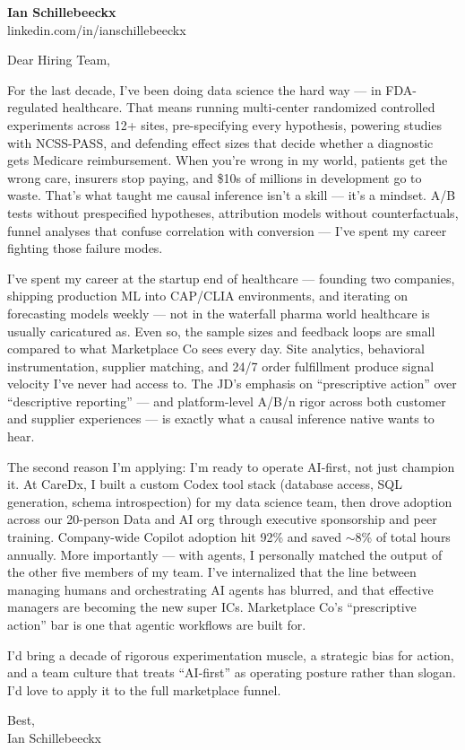 \documentclass[letterpaper,11pt]{article}
\begin{document}
\begin{flushleft}
\textbf{\Large Ian Schillebeeckx} \\
\vspace{2pt}
linkedin.com/in/ianschillebeeckx
\end{flushleft}

\vspace{12pt}

Dear Hiring Team,

For the last decade, I've been doing data science the hard way --- in FDA-regulated healthcare. That means running multi-center randomized controlled experiments across 12+ sites, pre-specifying every hypothesis, powering studies with NCSS-PASS, and defending effect sizes that decide whether a diagnostic gets Medicare reimbursement. When you're wrong in my world, patients get the wrong care, insurers stop paying, and \$10s of millions in development go to waste. That's what taught me causal inference isn't a skill --- it's a mindset. A/B tests without prespecified hypotheses, attribution models without counterfactuals, funnel analyses that confuse correlation with conversion --- I've spent my career fighting those failure modes.

I've spent my career at the startup end of healthcare --- founding two companies, shipping production ML into CAP/CLIA environments, and iterating on forecasting models weekly --- not in the waterfall pharma world healthcare is usually caricatured as. Even so, the sample sizes and feedback loops are small compared to what Marketplace Co sees every day. Site analytics, behavioral instrumentation, supplier matching, and 24/7 order fulfillment produce signal velocity I've never had access to. The JD's emphasis on ``prescriptive action'' over ``descriptive reporting'' --- and platform-level A/B/n rigor across both customer and supplier experiences --- is exactly what a causal inference native wants to hear.

The second reason I'm applying: I'm ready to operate AI-first, not just champion it. At CareDx, I built a custom Codex tool stack (database access, SQL generation, schema introspection) for my data science team, then drove adoption across our 20-person Data and AI org through executive sponsorship and peer training. Company-wide Copilot adoption hit 92\% and saved $\sim$8\% of total hours annually. More importantly --- with agents, I personally matched the output of the other five members of my team. I've internalized that the line between managing humans and orchestrating AI agents has blurred, and that effective managers are becoming the new super ICs. Marketplace Co's ``prescriptive action'' bar is one that agentic workflows are built for.

I'd bring a decade of rigorous experimentation muscle, a strategic bias for action, and a team culture that treats ``AI-first'' as operating posture rather than slogan. I'd love to apply it to the full marketplace funnel.

\vspace{10pt}

Best, \\
Ian Schillebeeckx
\end{document}
